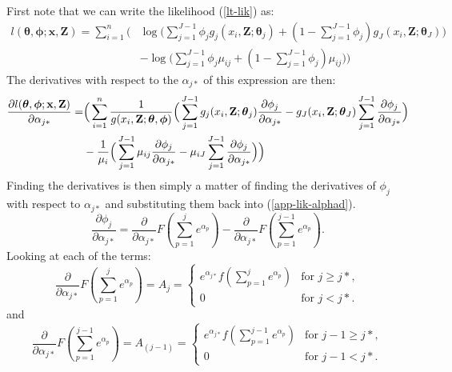 \documentclass[10pt]{article}
\begin{document}
First note that we can write the likelihood (\ref{lt-lik}) as:
\begin{align*}
l(\boldsymbol{\theta},\boldsymbol{\phi}; \mathbf{x},\mathbf{Z}) = \sum_{i=1}^n\Big( &\log \Big( \sum_{j=1}^{J-1} \phi_j g_j(x_i,\mathbf{Z}; \boldsymbol{\theta}_j) + (1-\sum_{j=1}^{J-1} \phi_j) g_J(x_i,\mathbf{Z}; \boldsymbol{\theta}_J)\Big) \\
&-  \log \Big(\sum_{j=1}^{J-1} \phi_j \mu_{ij} + (1-\sum_{j=1}^{J-1} \phi_j) \mu_{ij} \Big) \Big)
\end{align*}
The derivatives with respect to the $\alpha_{j*}$ of this expression are then:
\begin{align}
\frac{\partial l(\boldsymbol{\theta},\boldsymbol{\phi}; \mathbf{x},\mathbf{Z})}{\partial \alpha_{j*}} = &\Big( \sum_{i=1}^n \frac{1}{g(x_i,\mathbf{Z}; \boldsymbol{\theta},\boldsymbol{\phi})} \Big( \sum_{j=1}^{J-1} g_j(x_i,\mathbf{Z}; \boldsymbol{\theta}_j) \frac{\partial \phi_j}{\partial \alpha_{j*}}  -g_J(x_i,\mathbf{Z}; \boldsymbol{\theta}_J) \sum_{j=1}^{J-1}  \frac{\partial \phi_j}{\partial \alpha_{j*}}\Big) \notag \\
&- \frac{1}{\mu_i} \Big(\sum_{j=1}^{J-1} \mu_{ij} \frac{\partial \phi_j}{\partial \alpha_{j*}} - \mu_{iJ} \sum_{j=1}^{J-1}   \frac{\partial \phi_j}{\partial \alpha_{j*}} \Big)\Big) \label{app-lik-alphad}
\end{align}
Finding the derivatives is then simply a matter of finding the derivatives of $\phi_{j}$ with respect to $\alpha_{j*}$ and substituting them back into (\ref{app-lik-alphad}).
\begin{equation*}
\frac{\partial \phi_j}{\partial \alpha_{j*}} = \frac{\partial}{\partial \alpha_{j*}}F(\sum_{p=1}^j e^{\alpha_p}) - \frac{\partial}{\partial \alpha_{j*}} F(\sum_{p=1}^{j-1} e^{\alpha_p}).
\end{equation*}
Looking at each of the terms:
\begin{equation*}
\frac{\partial}{\partial \alpha_{j*}} F(\sum_{p=1}^j e^{\alpha_p})=A_{j}=\begin{cases}
e^{\alpha_{j*}}f(\sum_{p=1}^j e^{\alpha_p})& \text{for $j\geq j*$},\\
0 & \text{for $j<j*$}.
\end{cases}
\end{equation*}
and
\begin{equation*}
\frac{\partial}{\partial \alpha_{j*}} F(\sum_{p=1}^{j-1} e^{\alpha_p})=A_{(j-1)}=\begin{cases}
e^{\alpha_{j*}}f(\sum_{p=1}^{j-1} e^{\alpha_p})& \text{for $j-1\geq j*$},\\
0 & \text{for $j-1<j*$}.
\end{cases}
\end{equation*}
\end{document}
